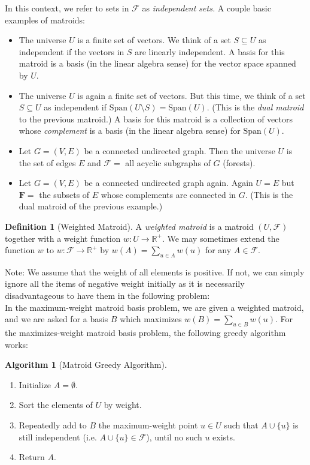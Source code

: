\documentclass[10pt]{article}
\theoremstyle{plain}
\theoremstyle{definition}
\newtheorem{defn}[thm]{Definition} %
\newtheorem{alg}[thm]{Algorithm}
\newcommand{\FF}{\mathbf{F}}
\newcommand{\RR}{\mathbb{R}}
\numberwithin{equation}{section}
\numberwithin{figure}{section}
\begin{document}
\noindent In this context, we refer to sets in $\mathcal{F}$ as \emph{independent sets.}  A couple basic examples of matroids:
\begin{itemize}
\item The universe $U$ is a finite set of vectors. We think of a set $S \subseteq U$ as independent if the vectors in $S$ are linearly independent. A basis for this matroid is a basis (in the linear algebra sense) for the vector space spanned by $U$.
\item The universe $U$ is again a finite set of vectors. But this time, we think of a set $S \subseteq U$ as independent if $\text{Span}(U \setminus S) = \text{Span}(U)$. (This is the \emph{dual matroid} to the previous matroid.) A basis for this matroid is a collection of vectors whose \emph{complement} is a basis (in the linear algebra sense) for $\text{Span}(U)$.
\item Let $G = (V, E)$ be a connected undirected graph. Then the universe $U$ is the set of edges $E$ and $\mathcal{F} =$ all acyclic subgraphs of $G$ (forests).
\item Let $G = (V, E)$ be a connected undirected graph again. Again $U = E$ but $\FF =$ the subsets of $E$ whose complements are connected in $G$. (This is the dual matroid of the previous example.)
\end{itemize}
\begin{defn}[Weighted Matroid]
A \emph{weighted matroid} is a matroid $(U, \mathcal{F})$ together with a weight function $w: U \to \RR^+$. We may sometimes extend the function $w$ to $w : \mathcal{F} \rightarrow \RR^+$ by $w(A) = \sum_{u \in A} w(u)$ for any $A \in \mathcal{F}$.
\end{defn}

\noindent Note: We assume that the weight of all elements is positive. If not, we can simply ignore all the items of negative weight initially as it is necessarily disadvantageous to have them in the following problem: \\

\noindent In the maximum-weight matroid basis problem, we are given a weighted matroid, and we are asked for a basis $B$ which maximizes $w(B) = \sum_{u \in B} w(u)$. For the maximizes-weight matroid basis problem, the following greedy algorithm works:
\begin{framed}
\begin{alg}[Matroid Greedy Algorithm] \ \\
\begin{enumerate}
\item Initialize $A = \emptyset$.
\item Sort the elements of $U$ by weight.
\item Repeatedly add to $B$ the maximum-weight point $u \in U$ such that $A \cup \{u\}$ is still independent (i.e. $A \cup \{u\} \in \mathcal{F}$), until no such $u$ exists.
\item Return $A$.
\end{enumerate} \label{greedy-alg}
\end{alg}
\end{framed}
\end{document}
